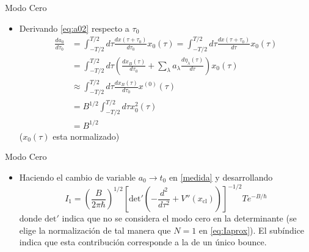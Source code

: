 \documentclass{beamer}
\theoremstyle{example}
\theoremstyle{example}
\begin{document}
\begin{frame}{Modo Cero}
\begin{itemize}
    \item Derivando \eqref{eq:a02} respecto a $\tau_0$ 
    \begin{align}
        \frac{da_0}{d\tau_0} &= \int_{-T/2}^{T/2} d\tau \frac{dx(\tau + \tau_0)}{d\tau_0}  x_0(\tau) =  \int_{-T/2}^{T/2} d\tau \frac{dx(\tau + \tau_0)}{d\tau}  x_0(\tau) \\
            &= \int_{-T/2}^{T/2} d\tau
            \left( \frac{dx_B(\tau)}{d\tau_0} +  \sum_\lambda a_\lambda  \frac{d\eta_\lambda(\tau)}{d\tau} \right) x_0(\tau) \\
            &\approx \int_{-T/2}^{T/2} d\tau
            \frac{dx_B(\tau)}{d\tau_0} x^{(0)}(\tau) \\
            &= B^{1/2} \int_{-T/2}^{T/2} d\tau x_0^2(\tau) \\
            &= B^{1/2} 
    \end{align}
    ($x_0(\tau)$ esta normalizado)
\end{itemize}
\end{frame}

\begin{frame}{Modo Cero}
\begin{itemize}
    \item Haciendo el cambio de variable $a_0 \rightarrow t_0$ en \eqref{medida} y desarrollando
    \begin{equation} \label{eq:I0}
        I_1 =\left( \frac{B}{2\pi \hbar} \right)^{1/2} \left[ \textrm{det}' \left(-\frac{d^2}{d\tau^2} + V''(x_{\textrm{cl}}) \right)\right]^{-1/2} T e^{-B/\hbar}
    \end{equation}
    donde $\textrm{det}'$ indica que no se considera el modo cero en la determinante (se elige la normalización de tal manera que $N = 1$ en \eqref{eq:Iaprox}). El subíndice indica que esta contribución corresponde a la de un único bounce. 
\end{itemize}
\end{frame}
\end{document}
